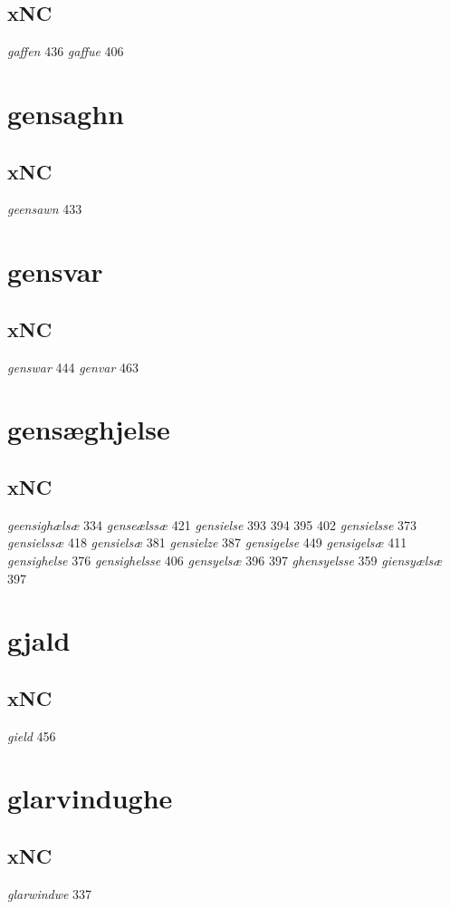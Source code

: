 \documentclass[a4paper,twocolumn]{article}
\begin{document}
\subsection{xNC}
\label{sec:org5d9a527}
\emph{gaffen} 436 \emph{gaffue} 406 
\section{gensaghn}
\label{sec:org4813df5}
\subsection{xNC}
\label{sec:org27d23bd}
\emph{geensawn} 433 
\section{gensvar}
\label{sec:org2919d42}
\subsection{xNC}
\label{sec:orgcbbec87}
\emph{genswar} 444 \emph{genvar} 463 
\section{gensæghjelse}
\label{sec:org9d6e99d}
\subsection{xNC}
\label{sec:org9a5e23a}
\emph{geensighælsæ} 334 \emph{genseælssæ} 421 \emph{gensielse} 393 394 395 402 \emph{gensielsse} 373 \emph{gensielssæ} 418 \emph{gensielsæ} 381 \emph{gensielze} 387 \emph{gensigelse} 449 \emph{gensigelsæ} 411 \emph{gensighelse} 376 \emph{gensighelsse} 406 \emph{gensyelsæ} 396 397 \emph{ghensyelsse} 359 \emph{giensyælsæ} 397 
\section{gjald}
\label{sec:org4009eca}
\subsection{xNC}
\label{sec:org45d11a4}
\emph{gield} 456 
\section{glarvindughe}
\label{sec:org9a8a1ae}
\subsection{xNC}
\label{sec:orgf5200c3}
\emph{glarwindwe} 337 
\end{document}
